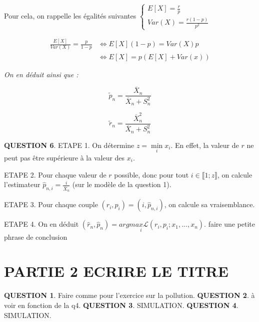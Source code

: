 \documentclass[a4paper,11pt]{article}
\newcommand{\quest}[1]{\small\textbf{#1}\normalsize}
\theoremstyle{nonumberplain}
\theoremstyle{nonumberplain}
\theoremstyle{nonumberplain}
\begin{document}
      \medskip
      Pour cela, on rappelle les égalités suivantes
      $
        \begin{cases}
            E[X] = \frac{r}{p} \\
            Var(X) = \frac{r (1 - p)}{p^2}
        \end{cases}
      $
      \begin{calculs}
          \vspace{-2ex}
          \begin{equation*}
          \begin{split}
              \frac{E[X]}{Var(X)} = \frac{p}{1 - p} & \iff E[X](1 - p) = Var(X) p \\
                                                    & \iff E[X] = p(E[X] + Var(x))
          \end{split}
          \end{equation*}

          \emph{On en déduit ainsi que :}

          \[
              \tilde{p}_n = \frac{\overline{X}_n}{\overline{X}_n + S_n^2}
          \]

          \[
              \tilde{r}_n = \frac{\overline{X}_n^2}{\overline{X}_n + S_n^2}
          \]
      \end{calculs}

      \quest{QUESTION 6}. ETAPE 1. On détermine $z = \min\limits_{i} x_i$.
      En effet, la valeur de $r$ ne peut pas être supérieure à la valeur des $x_i$. \newline

      ETAPE 2. Pour chaque valeur de $r$ possible, donc pour tout $i \in \llbracket 1; z \rrbracket$, on calcule
      l'estimateur $\hat{p}_{n, i} = \frac{i}{\overline{X}_n}$ (sur le modèle de la question 1). \newline

      ETAPE 3. Pour chaque couple $(r_i, p_i) = (i, \hat{p}_{n, i})$, on calcule sa vraisemblance.\newline

      ETAPE 4. On en déduit $(\hat{r}_{n}, \hat{p}_{n}) = argmax\limits_{i} \mathcal{L}(r_i, p_i; x_1, ..., x_n)$.
      faire une petite phrase de conclusion

    \section{PARTIE 2 ECRIRE LE TITRE}

      \quest{QUESTION 1}. Faire comme pour l'exercice sur la pollution.
      \quest{QUESTION 2}. à voir en fonction de la q4.
      \quest{QUESTION 3}. SIMULATION.
      \quest{QUESTION 4}. SIMULATION.
\end{document}
